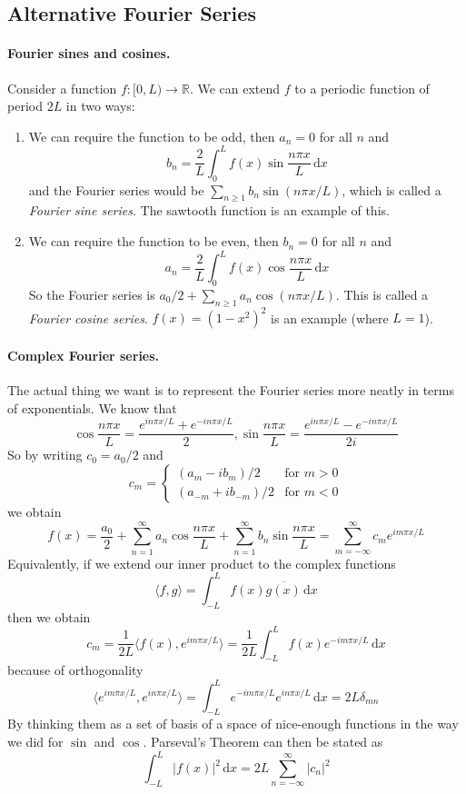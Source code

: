 \documentclass[a4paper]{article}
\begin{document}
\subsection{Alternative Fourier Series}
\paragraph{Fourier sines and cosines.}
Consider a function $f:[0,L)\to\mathbb R$.
We can extend $f$ to a periodic function of period $2L$ in two ways:
\begin{enumerate}
    \item We can require the function to be odd, then $a_n=0$ for all $n$ and
    \begin{equation}
        b_n=\frac{2}{L}\int_0^Lf(x)\sin\frac{n\pi x}{L}\,\mathrm dx
    \end{equation}
    and the Fourier series would be $\sum_{n\ge 1}b_n\sin(n\pi x/L)$, which is called a \textit{Fourier sine series}.
    The sawtooth function is an example of this.
    \item We can require the function to be even, then $b_n=0$ for all $n$ and
    \begin{equation}
        a_n=\frac{2}{L}\int_0^Lf(x)\cos\frac{n\pi x}{L}\,\mathrm dx
    \end{equation}
    So the Fourier series is $a_0/2+\sum_{n\ge 1}a_n\cos(n\pi x/L)$.
    This is called a \textit{Fourier cosine series}.
    $f(x)=(1-x^2)^2$ is an example (where $L=1$).
\end{enumerate}
\paragraph{Complex Fourier series.}
The actual thing we want is to represent the Fourier series more neatly in terms of exponentials.
We know that
$$\cos\frac{n\pi x}{L}=\frac{e^{in\pi x/L}+e^{-in\pi x/L}}{2},\sin\frac{n\pi x}{L}=\frac{e^{in\pi x/L}-e^{-in\pi x/L}}{2i}$$
So by writing $c_0=a_0/2$ and
$$c_m=\begin{cases}
    (a_m-ib_m)/2&\text{for $m>0$}\\
    (a_{-m}+ib_{-m})/2&\text{for $m<0$}
\end{cases}$$
we obtain
\begin{equation}
    f(x)=\frac{a_0}{2}+\sum_{n=1}^\infty a_n\cos\frac{n\pi x}{L}+\sum_{n=1}^\infty b_n\sin\frac{n\pi x}{L}=\sum_{m=-\infty}^\infty c_me^{im\pi x/L}
\end{equation}
Equivalently, if we extend our inner product to the complex functions
$$\langle f,g\rangle=\int_{-L}^Lf(x)\overline{g(x)}\,\mathrm dx$$
then we obtain
\begin{equation}
    c_m=\frac{1}{2L}\langle f(x),e^{im\pi x/L}\rangle=\frac{1}{2L}\int_{-L}^Lf(x)e^{-im\pi x/L}\,\mathrm dx
\end{equation}
because of orthogonality
\begin{equation}
    \langle e^{im\pi x/L},e^{in\pi x/L}\rangle= \int_{-L}^{L} e^{-im\pi x/L}e^{in\pi x/L} \,\mathrm{d}x=2L\delta_{mn}
\end{equation}
By thinking them as a set of basis of a space of nice-enough functions in the way we did for $\sin$ and $\cos$.
Parseval's Theorem can then be stated as
$$\int_{-L}^L|f(x)|^2\,\mathrm dx=2L\sum_{n=-\infty}^\infty|c_n|^2$$
\end{document}
